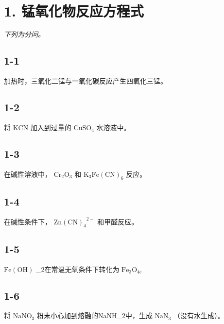 \section*{1. 锰氧化物反应方程式}
\textit{下列为分问。}

\subsection*{1-1}
加热时，三氧化⼆锰与⼀氧化碳反应产⽣四氧化三锰。

\subsection*{1-2}
将 $\mathrm { K C N }$ 加⼊到过量的 $\mathrm { C u S O _ { 4 } }$ ⽔溶液中。

\subsection*{1-3}
在碱性溶液中， $\mathrm { { C r } _ { 2 } O _ { 3 } }$ 和 $\mathrm { K _ { 3 } F e ( C N ) _ { 6 } }$ 反应。

\subsection*{1-4}
在碱性条件下， $\mathrm { Z n ( C N ) _ { 4 } } ^ { 2 - }$ 和甲醛反应。

\subsection*{1-5}
$\mathrm { F e ( O H ) }$ _{2}在常温⽆氧条件下转化为 $\mathrm { F e _ { 3 } O _ { 4 c } }$

\subsection*{1-6}
将 $\mathrm { N a N O _ { 3 } }$ 粉末⼩⼼加到熔融的NaNH_{2}中，⽣成 $\mathrm { N a N _ { 3 } }$ （没有⽔⽣成）。
